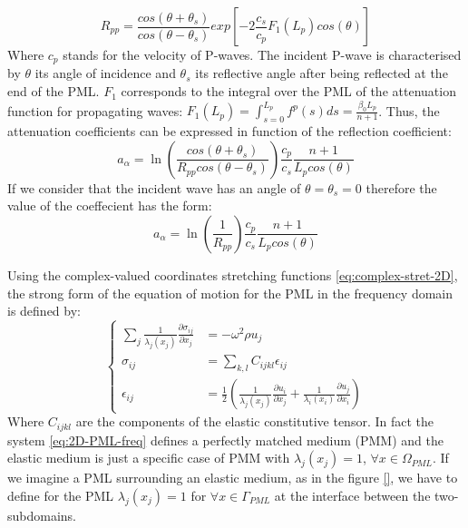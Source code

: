 \begin{equation}
R_{pp} = \frac{cos(\theta+\theta_s)}{cos(\theta-\theta_s)} exp\left[-2\frac{c_s}{c_p}F_1(L_p)cos(\theta)\right]
\label{eq:Rpp} 
\end{equation} 
Where $c_p$ stands for the velocity of P-waves. The incident P-wave is characterised by $\theta$ its angle of incidence and $\theta_s$ its reflective angle after being reflected at the end of the PML. $F_1$ corresponds to the integral over the PML of the attenuation function for propagating waves: $F_1(L_p) = \int_{s=0}^{L_p} f^p(s) ds = \frac{\beta_0 L_p}{n+1}$. Thus, the attenuation coefficients can be expressed in function of the reflection coefficient:
\begin{equation}
a_\alpha = \ln\left(\frac{cos(\theta+\theta_s)}{R_{pp}cos(\theta-\theta_s)} \right) \frac{c_p}{c_s} \frac{n+1}{L_p cos(\theta)}
\end{equation} 
If we consider that the incident wave has an angle of $\theta = \theta_s = 0$ therefore the value of the coeffecient has the form:
\begin{equation}
a_\alpha = \ln\left(\frac{1}{R_{pp}} \right) \frac{c_p}{c_s} \frac{n+1}{L_p cos(\theta)}
\end{equation}
\par Using the complex-valued coordinates stretching functions \ref{eq:complex-stret-2D}, the strong form of the equation of motion for the PML in the frequency domain is defined by:
\begin{equation}
\begin{cases}
\sum_{j} \frac{1}{\lambda_j(x_j)} \frac{\partial \sigma_{ij}}{\partial x_j} & = - \omega^2 \rho u_j \\
\sigma_{ij} &= \sum_{k,l} C_{ijkl} \epsilon_{ij} \\
\epsilon_{ij} &= \frac{1}{2} \left(\frac{1}{\lambda_j(x_j)} \frac{\partial u_{i}}{\partial x_j} + \frac{1}{\lambda_i(x_i)} \frac{\partial u_{j}}{\partial x_i} \right)
\end{cases}
\label{eq:2D-PML-freq}
\end{equation} 
Where $C_{ijkl}$ are the components of the elastic constitutive tensor. In fact the system \ref{eq:2D-PML-freq} defines a perfectly matched medium (PMM) and the elastic medium is just a specific case of PMM with $\lambda_j(x_j) = 1$, $\forall x \in \Omega_{PML}$. If we imagine a PML surrounding an elastic medium, as in the figure \ref{}, we have to define for the PML $\lambda_j(x_j) = 1$ for $\forall x \in \Gamma_{PML}$ at the interface between the two-subdomains. 
 
